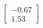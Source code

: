 \documentclass[preview]{standalone}
\begin{document}
\begin{align*}
\begin{bmatrix} -0.67 \\ 1.53 \end{bmatrix}
\end{align*}
\end{document}
